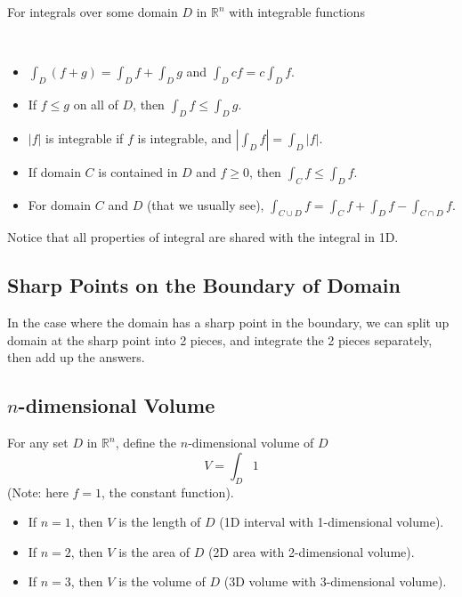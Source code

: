 For integrals over some domain $D$ in $\mathbb{R}^n$ with integrable functions 

{~~~}

\begin{itemize}
    \item $\int_D(f + g) = \int_D f + \int_D g$ and $\int_D cf = c \int_D f$.
    
    \item If $f \le g$ on all of $D$, then $\int_D f \le \int_D g$. 
    
    \item $|f|$ is integrable if $f$ is integrable, and $\left| \int_D f \right| = \int_D |f|$. 

    \item If domain $C$ is contained in $D$ and $f \ge 0$, then $\int_C f \le \int_D f$. 
    
    \item For domain $C$ and $D$ (that we usually see), $\int_{C \cup D} f = \int_C f + \int_D f - \int_{C \cap D} f$. 
\end{itemize}

Notice that all properties of integral are shared with the integral in 1D.

\subsection*{Sharp Points on the Boundary of Domain}

In the case where the domain has a sharp point in the boundary, we can split up domain at the sharp point into 2 pieces, and integrate the 2 pieces separately, then add up the answers.

\subsection*{$n$-dimensional Volume}

For any set $D$ in $\mathbb{R}^n$, define the $n$-dimensional volume of $D$ $$V = \int_D 1$$ (Note: here $f = 1$, the constant function). 

\begin{itemize}
    \item If $n = 1$, then $V$ is the length of $D$ (1D interval with 1-dimensional volume). 
    \item If $n = 2$, then $V$ is the area of $D$ (2D area with 2-dimensional volume). 
    \item If $n = 3$, then $V$ is the volume of $D$ (3D volume with 3-dimensional volume). 
\end{itemize}

